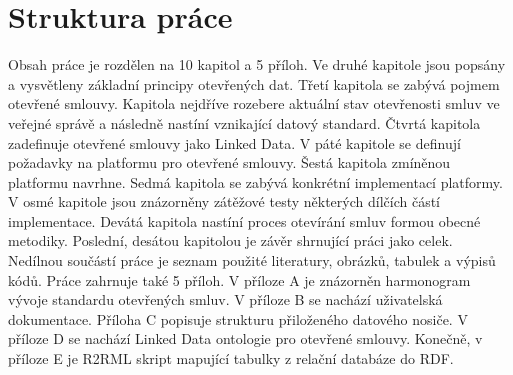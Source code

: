 \section{Struktura práce}

Obsah práce je rozdělen na 10 kapitol a 5 příloh. Ve druhé kapitole jsou popsány a vysvětleny základní principy otevřených dat. Třetí kapitola se zabývá pojmem otevřené smlouvy. Kapitola nejdříve rozebere aktuální stav otevřenosti smluv ve veřejné správě a následně nastíní vznikající datový standard. Čtvrtá kapitola zadefinuje otevřené smlouvy jako Linked Data. V páté kapitole se definují požadavky na platformu pro otevřené smlouvy. Šestá kapitola zmíněnou platformu navrhne. Sedmá kapitola se zabývá konkrétní implementací platformy. V osmé kapitole jsou znázorněny zátěžové testy některých dílčích částí implementace. Devátá kapitola nastíní proces otevírání smluv formou obecné metodiky. Poslední, desátou kapitolou je závěr shrnující práci jako celek. Nedílnou součástí práce je seznam použité literatury, obrázků, tabulek a výpisů kódů. Práce zahrnuje také 5 příloh. V příloze A je znázorněn harmonogram vývoje standardu otevřených smluv. V příloze B se nachází uživatelská dokumentace. Příloha C popisuje strukturu přiloženého datového nosiče. V příloze D se nachází Linked Data ontologie pro otevřené smlouvy. Konečně, v příloze E je R2RML skript mapující tabulky z relační databáze do RDF.

